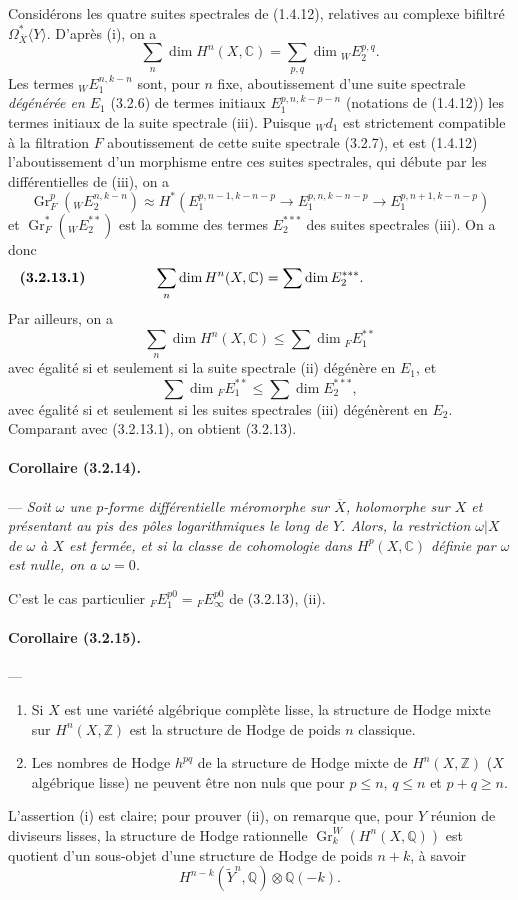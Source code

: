 \documentclass[10pt]{article}
\newcommand{\C}{\mathbb C}
\newcommand{\Q}{\mathbb Q}
\newcommand{\Z}{\mathbb Z}
\newcommand{\Gr}{\operatorname{Gr}}
\begin{document}
Considérons les quatre suites spectrales de (1.4.12), relatives au complexe bifiltré $\Omega_{\overline X}^{*}\langle Y\rangle$. D'après (i), on a
\[
\sum_n\dim H^n(X,\C)=\sum_{p,q}\dim {}_WE_2^{p,q}.
\]
Les termes ${}_WE_1^{n,k-n}$ sont, pour $n$ fixe, aboutissement d'une suite spectrale \emph{dégénérée en $E_1$} (3.2.6) de termes initiaux $E_1^{p,n,k-p-n}$ (notations de (1.4.12)) les termes initiaux de la suite spectrale (iii). Puisque ${}_Wd_1$ est strictement compatible à la filtration $F$ aboutissement
de cette suite spectrale (3.2.7), et est (1.4.12) l'aboutissement d'un morphisme entre ces suites spectrales, qui débute par les différentielles de (iii), on a
\[
\Gr_F^p({}_WE_2^{n,k-n})\approx
H^*(E_1^{p,n-1,k-n-p}\to E_1^{p,n,k-n-p}\to E_1^{p,n+1,k-n-p})
\]
et $\Gr_F^*({}_WE_2^{**})$ est la somme des termes $E_2^{***}$ des suites spectrales (iii). On a donc
\[
\makebox[\textwidth][s]{\textbf{(3.2.13.1)}\hfill$\displaystyle \sum_n \dim H^n(X,\C)=\sum\dim E_2^{***}.$\hfill\phantom{\textbf{(3.2.13.1)}}}
\]
Par ailleurs, on a
\[
\sum_n \dim H^n(X,\C)\le \sum \dim {}_F E_1^{**}
\]
avec égalité si et seulement si la suite spectrale (ii) dégénère en $E_1$, et
\[
\sum\dim {}_F E_1^{**}\le \sum\dim E_2^{***},
\]
avec égalité si et seulement si les suites spectrales (iii) dégénèrent en $E_2$. Comparant avec (3.2.13.1), on obtient (3.2.13).

\paragraph{Corollaire (3.2.14).} --- {\itshape Soit $\omega$ une $p$-forme différentielle méromorphe sur $\overline X$, holomorphe sur $X$ et présentant au pis des pôles logarithmiques le long de $Y$. Alors, la restriction $\omega|X$ de $\omega$ à $X$ est fermée, et si la classe de cohomologie dans $H^p(X,\C)$ définie par $\omega$ est nulle, on a $\omega=0$.}

C'est le cas particulier ${}_FE_1^{p0}={}_FE_\infty^{p0}$ de (3.2.13), (ii).

\paragraph{Corollaire (3.2.15).} --- {\itshape
\begin{enumerate}[label=(\roman*),font=\itshape]
\item Si $X$ est une variété algébrique complète lisse, la structure de Hodge mixte sur $H^n(X,\Z)$ est la structure de Hodge de poids $n$ classique.
\item Les nombres de Hodge $h^{pq}$ de la structure de Hodge mixte de $H^n(X,\Z)$ ($X$ algébrique lisse) ne peuvent être non nuls que pour $p\le n$, $q\le n$ et $p+q\ge n$.
\end{enumerate}}
L'assertion (i) est claire; pour prouver (ii), on remarque que, pour $Y$ réunion de diviseurs lisses, la structure de Hodge rationnelle $\Gr_k^W(H^n(X,\Q))$ est quotient d'un sous-objet d'une structure de Hodge de poids $n+k$, à savoir
\[
H^{n-k}(\widetilde Y^n,\Q)\otimes\Q(-k).
\]
\end{document}
